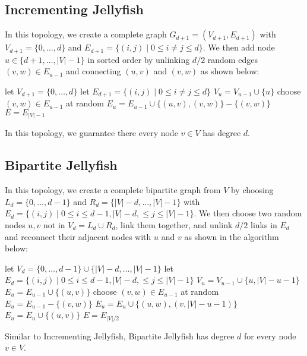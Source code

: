 \documentclass[conference]{IEEEtran}
\begin{document}
\subsection{Incrementing Jellyfish}
In this topology, we create a complete graph $G_{d+1} = (V_{d+1}, E_{d+1})$ with $V_{d+1} = \{0,\dots, d\}$ and $E_{d+1} = \{ (i,j) \mid 0 \leq i \neq j \leq d \}$. We then add node $u \in \{d+1, \dots, |V| - 1\}$ in sorted order by unlinking $d/2$ random edges $(v,w) \in E_{u-1}$ and connecting $(u,v)$ and $(v,w)$ as shown below:
\begin{algorithm}[H]
\caption{}
  \begin{algorithmic}[1]
    \State let $V_{d+1} = \{0,\dots, d\}$
    \State let $E_{d+1} = \{ (i,j) \mid 0 \leq i \neq j \leq d \}$
    \State $V_u = V_{u-1} \cup \{u\}$
        \State choose $(v,w) \in E_{u-1}$ at random
        \State $E_{u} = E_{u-1} \cup \{ (u,v), (v,w) \} - \{(v,w)\} $
      \EndFor
    \EndFor
    \State $E = E_{|V|-1}$
  \EndFunction
  \end{algorithmic}
\end{algorithm} 

In this topology, we guarantee there every node $v\in V$ has degree $d$. 
\subsection{Bipartite Jellyfish}

In this topology, we create a complete bipartite graph from $V$ by choosing $L_d = \{0, \dots, d-1\}$ and $R_d = \{|V|-d , \dots, |V| - 1\}$ with $E_d = \{(i,j) \mid 0 \leq i \leq d-1 , |V| - d, \leq j \leq |V| - 1\} $. We then choose two random nodes $u,v$ not in $V_d = L_d \cup R_d$, link them together, and unlink $d/2$ links in $E_d$ and reconnect their adjacent nodes with $u$ and $v$ as shown in the algorithm below:

\begin{algorithm}[H]
\caption{}
  \begin{algorithmic}[1]
    \State let $V_{d} = \{0,\dots, d-1\} \cup \{|V|-d, \dots, |V|-1\}$
    \State let $E_d = \{(i,j) \mid 0 \leq i \leq d-1 , |V| - d, \leq j \leq |V| - 1\}$
    \State $V_u = V_{u-1} \cup \{u, |V| - u - 1 \}$
    \State $E_u = E_{u-1} \cup \{(u,v)\}$
        \State choose $(v,w) \in E_{u-1}$ at random
        \State $E_{u} = E_{u-1} - \{(v,w)\}$
        \State $E_{u} = E_u \cup \{ (u,w), (v,|V|-u-1) \} $
      \EndFor
      \State $E_u = E_{u} \cup \{(u,v)\}$
    \EndFor
    \State $E = E_{|V|/2}$
  \EndFunction
  \end{algorithmic}
\end{algorithm} 
Similar to Incrementing Jellyfish, Bipartite Jellyfish has degree $d$ for every node $v \in V$.
\end{document}
